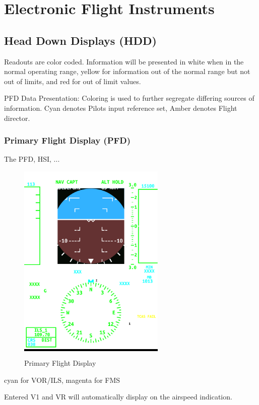 \part{Electronic Flight Instruments}

\chapter{Head Down Displays (HDD)}
\label{chap:hdd}

Readouts are color coded. Information will be presented in white when in the normal operating range, yellow for information out of the normal range but not out of limits, and red for out of limit values.

PFD Data Presentation: Coloring is used to further segregate differing sources of information. Cyan denotes Pilots input reference set, Amber denotes Flight director.

\newpage
\section{Primary Flight Display (PFD)}
\label{sec:pfd}

The \gls{PFD}, \gls{HSI}, ...

\begin{figure}[h]
  \centering
  \colorbox{black}{\includegraphics[width=7cm]{figures/hdd/PFD}}
  \caption{Primary Flight Display}
\end{figure}

cyan for VOR/ILS, magenta for FMS

Entered V1 and VR will automatically display on the airspeed indication.

